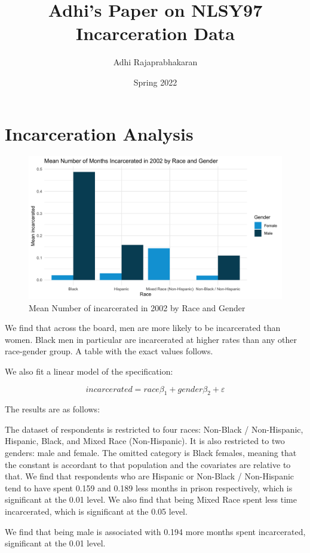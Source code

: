 \documentclass{article}
\author{Adhi Rajaprabhakaran}
\title{Adhi's Paper on NLSY97 Incarceration Data}
\date{Spring 2022}
\begin{document}
\maketitle


\section{Incarceration Analysis}

\begin{figure}[H]
    \begin{center}
        \includegraphics[width=.85\textwidth]{incarcerated_by_racegender}
    \end{center}
    \caption{Mean Number of incarcerated in 2002 by Race and Gender}
    \label{fig:graph}
\end{figure}

We find that across the board, men are more likely to be incarcerated than women. Black men in particular are incarcerated at higher rates than any other race-gender group. A table with the exact values follows.



We also fit a linear model of the specification:

$$
    incarcerated = race\beta_1 + gender\beta_2 + \varepsilon
$$

The results are as follows:



The dataset of respondents is restricted to four races: Non-Black / Non-Hispanic, Hispanic, Black, and Mixed Race (Non-Hispanic). It is also restricted to two genders: male and female. The omitted category is Black females, meaning that the constant is accordant to that population and the covariates are relative to that. We find that respondents who are Hispanic or Non-Black / Non-Hispanic tend to have spent 0.159 and 0.189 less months in prison respectively, which is significant at the 0.01 level. We also find that being Mixed Race spent less time incarcerated, which is significant at the 0.05 level.

We find that being male is associated with 0.194 more months spent incarcerated, significant at the 0.01 level.
\end{document}
